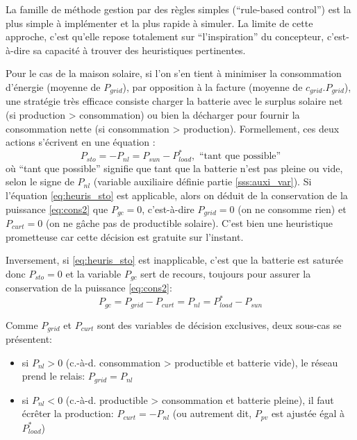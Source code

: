 \documentclass[a4paper,10pt,twocolumn]{article}
\begin{document}
La famille de méthode gestion par des règles simples (``rule-based control'')
est la plus simple à implémenter et la plus rapide à simuler.
La limite de cette approche, c'est qu'elle repose totalement
sur ``l'inspiration'' du concepteur, c'est-à-dire sa capacité à trouver
des heuristiques pertinentes.

Pour le cas de la maison solaire, si l'on s'en tient à minimiser
la consommation d'énergie (moyenne de $P_{grid}$),
par opposition à la facture (moyenne de $c_{grid}.P_{grid}$),
une stratégie très efficace consiste charger la batterie
avec le surplus solaire net (si production > consommation)
ou bien la décharger pour fournir la consommation nette (si consommation > production).
Formellement, ces deux actions s'écrivent en une équation :
%
\begin{equation} \label{eq:heuris_sto}
  P_{sto} = -P_{nl} = P_{sun} - P_{load}^*, \text{ ``tant que possible''}
\end{equation}
%
où ``tant que possible'' signifie que tant que la batterie n'est pas pleine ou vide,
selon le signe de $P_{nl}$
(variable auxiliaire définie partie \ref{sss:auxi_var}).
%
Si l'équation \eqref{eq:heuris_sto} est applicable, alors on déduit
de la conservation de la puissance \eqref{eq:cons2} que $P_{gc} = 0$,
c'est-à-dire $P_{grid} = 0$ (on ne consomme rien) et
$P_{curt} = 0$ (on ne gâche pas de productible solaire).
C'est bien une heuristique prometteuse car cette décision est gratuite
sur l'instant.

Inversement, si \eqref{eq:heuris_sto} est inapplicable,
c'est que la batterie est saturée donc $P_{sto} = 0$
et la variable $P_{gc}$ sert de recours,
toujours pour assurer la conservation de la puissance \eqref{eq:cons2}:
%
\begin{equation}
  P_{gc} = P_{grid} - P_{curt} = P_{nl} = P_{load}^* - P_{sun}
\end{equation}

Comme $P_{grid}$ et $P_{curt}$ sont des variables de décision exclusives, deux sous-cas se présentent:
\begin{itemize}
 \item si $P_{nl}>0$ (c.-à-d. consommation > productible et batterie vide),
 le réseau prend le relais: $P_{grid} = P_{nl}$
 \item si $P_{nl}<0$ (c.-à-d. productible > consommation et batterie pleine),
 il faut écrêter la production: $P_{curt} = - P_{nl}$
 (ou autrement dit, $P_{pv}$ est ajustée égal à $P_{load}^*$)
\end{itemize}
\end{document}
